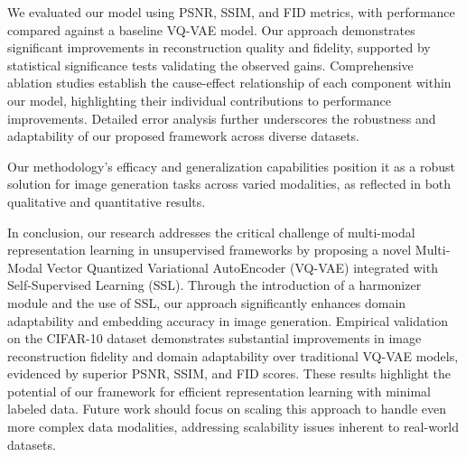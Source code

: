 \documentclass{article} %
\begin{document}
We evaluated our model using PSNR, SSIM, and FID metrics, with performance compared against a baseline VQ-VAE model. Our approach demonstrates significant improvements in reconstruction quality and fidelity, supported by statistical significance tests validating the observed gains. Comprehensive ablation studies establish the cause-effect relationship of each component within our model, highlighting their individual contributions to performance improvements. Detailed error analysis further underscores the robustness and adaptability of our proposed framework across diverse datasets.

Our methodology's efficacy and generalization capabilities position it as a robust solution for image generation tasks across varied modalities, as reflected in both qualitative and quantitative results.



In conclusion, our research addresses the critical challenge of multi-modal representation learning in unsupervised frameworks by proposing a novel Multi-Modal Vector Quantized Variational AutoEncoder (VQ-VAE) integrated with Self-Supervised Learning (SSL). Through the introduction of a harmonizer module and the use of SSL, our approach significantly enhances domain adaptability and embedding accuracy in image generation. Empirical validation on the CIFAR-10 dataset demonstrates substantial improvements in image reconstruction fidelity and domain adaptability over traditional VQ-VAE models, evidenced by superior PSNR, SSIM, and FID scores. These results highlight the potential of our framework for efficient representation learning with minimal labeled data. Future work should focus on scaling this approach to handle even more complex data modalities, addressing scalability issues inherent to real-world datasets.




\end{document}
